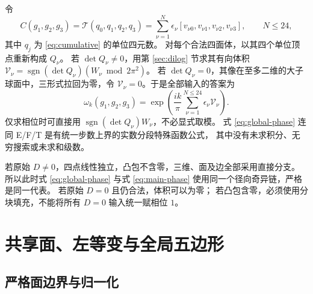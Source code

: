 \documentclass[UTF8,11pt,fontset=none]{ctexart}
\numberwithin{equation}{section}
\theoremstyle{definition}
\DeclareMathOperator{\sgn}{sgn}
\begin{document}
令
\begin{equation}
 C(g_1,g_2,g_3)=\mathcal T(q_0,q_1,q_2,q_3)
 =\sum_{\nu=1}^{N}\epsilon_\nu
 [v_{\nu0},v_{\nu1},v_{\nu2},v_{\nu3}],\qquad N\le24,
 \label{eq:T-expansion}
\end{equation}
其中 $q_j$ 为 \eqref{eq:cumulative} 的单位四元数。
对每个合法四面体，以其四个单位顶点重新构成 $Q_\nu$。
若 $\det Q_\nu\ne0$，用第 \ref{sec:dilog} 节求其有向体积
$\mathcal V_\nu=\sgn(\det Q_\nu)(W_\nu\bmod2\pi^2)$。
若 $\det Q_\nu=0$，其像在至多二维的大子球面中，三形式拉回为零，令
$\mathcal V_\nu=0$。于是全部输入的答案为
\begin{equation}
 \boxed{\qquad
 \omega_k(g_1,g_2,g_3)
 =\exp\left(\frac{ik}{\pi}
 \sum_{\nu=1}^{N\le24}\epsilon_\nu\mathcal V_\nu\right).
 \qquad}
 \label{eq:global-phase}
\end{equation}
仅求相位时可直接用 $\sgn(\det Q_\nu)W_\nu$，不必显式取模。
式 \eqref{eq:global-phase} 连同 E/F/T 是有统一步数上界的实数分段特殊函数公式，
其中没有未求积分、无穷搜索或未求和级数。

若原始 $D\ne0$，四点线性独立，凸包不含零，三维、面及边全部采用直接分支。
所以此时式 \eqref{eq:global-phase} 与式 \eqref{eq:main-phase}
使用同一个径向奇异链，严格是同一代表。
若原始 $D=0$ 且仍合法，体积可以为零；
若凸包含零，必须使用分块填充，不能将所有 $D=0$ 输入统一赋相位 $1$。

\section{共享面、左等变与全局五边形}\label{sec:pentagon}

\subsection{严格面边界与归一化}
\end{document}
